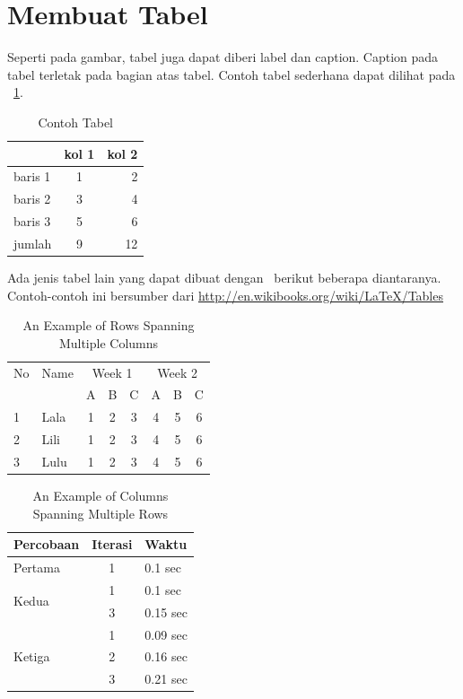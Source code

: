 \section{Membuat Tabel}
Seperti pada gambar, tabel juga dapat diberi label dan caption. Caption pada
tabel terletak pada bagian atas tabel. Contoh tabel sederhana dapat dilihat
pada \tab~\ref{tab:tab1}.

\begin{table}
	\centering
	\caption{Contoh Tabel}
	\label{tab:tab1}
	\begin{tabular}{| l | c r |}
		\hline
		& kol 1 & kol 2 \\
		\hline
		baris 1 & 1 & 2 \\
		baris 2 & 3 & 4 \\
		baris 3 & 5 & 6 \\
		jumlah  & 9 & 12 \\
		\hline
	\end{tabular}
\end{table}

Ada jenis tabel lain yang dapat dibuat dengan \latex~berikut beberapa
diantaranya. Contoh-contoh ini bersumber dari
\url{http://en.wikibooks.org/wiki/LaTeX/Tables}

\begin{table}
	\centering
	\caption{An Example of Rows Spanning Multiple Columns}
	\label{row.spanning}
	\begin{tabular}{|l|l|*{6}{c|}} \hline %
		No & Name & \multicolumn{3}{|c|}{Week 1} & \multicolumn{3}{|c|}{Week 2}
		\\
		\cline{3-8} %
		& & A & B & C & A & B & C\\
		\hline
		1 & Lala & 1 & 2 & 3 & 4 & 5 & 6\\
		2 & Lili & 1 & 2 & 3 & 4 & 5 & 6\\
		3 & Lulu & 1 & 2 & 3 & 4 & 5 & 6\\
		\hline
	\end{tabular}
\end{table}

\begin{table}
	\centering
	\caption{An Example of Columns Spanning Multiple Rows}
	\label{column.spanning}
	\begin{tabular}{|l|c|l|}
		\hline
		Percobaan & Iterasi & Waktu \\
		\hline
		Pertama & 1 & 0.1 sec \\ \hline
		\multirow{2}{*}{Kedua} & 1 & 0.1 sec \\
		& 3 & 0.15 sec \\
		\hline
		\multirow{3}{*}{Ketiga} & 1 & 0.09 sec \\
		& 2 & 0.16 sec \\
		& 3 & 0.21 sec \\
		\hline
	\end{tabular}
\end{table}

